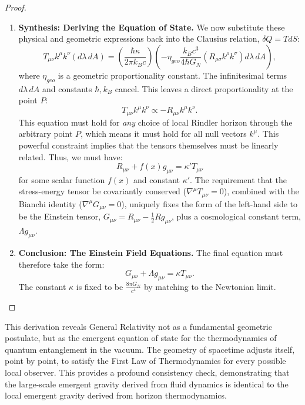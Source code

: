 \documentclass[11pt, letterpaper]{report}
\theoremstyle{plain} %
\theoremstyle{definition} %
\theoremstyle{remark} %
\begin{document}
\begin{proof}
\begin{enumerate}
    \item \textbf{Synthesis: Deriving the Equation of State.}
    We now substitute these physical and geometric expressions back into the Clausius relation, $\delta Q = T dS$:
    $$
    T_{\mu\nu} k^\mu k^\nu (d\lambda \, dA) = \left( \frac{\hbar \kappa}{2\pi k_B c} \right) \left( - \eta_{geo} \frac{k_B c^3}{4\hbar G_N} (R_{\rho\sigma}k^\rho k^\sigma) d\lambda \, dA \right),
    $$
    where $\eta_{geo}$ is a geometric proportionality constant. The infinitesimal terms $d\lambda \, dA$ and constants $\hbar, k_B$ cancel. This leaves a direct proportionality at the point $P$:
    \begin{equation}
        T_{\mu\nu} k^\mu k^\nu \propto -R_{\mu\nu}k^\mu k^\nu.
    \end{equation}
    This equation must hold for \textit{any} choice of local Rindler horizon through the arbitrary point $P$, which means it must hold for all null vectors $k^\mu$. This powerful constraint implies that the tensors themselves must be linearly related. Thus, we must have:
    \begin{equation}
        R_{\mu\nu} + f(x) g_{\mu\nu} = \kappa' T_{\mu\nu}
    \end{equation}
    for some scalar function $f(x)$ and constant $\kappa'$. The requirement that the stress-energy tensor be covariantly conserved ($\nabla^\mu T_{\mu\nu}=0$), combined with the Bianchi identity ($\nabla^\mu G_{\mu\nu}=0$), uniquely fixes the form of the left-hand side to be the Einstein tensor, $G_{\mu\nu} = R_{\mu\nu} - \frac{1}{2}Rg_{\mu\nu}$, plus a cosmological constant term, $\Lambda g_{\mu\nu}$.

    \item \textbf{Conclusion: The Einstein Field Equations.}
    The final equation must therefore take the form:
    \begin{equation}
        G_{\mu\nu} + \Lambda g_{\mu\nu} = \kappa T_{\mu\nu}.
    \end{equation}
    The constant $\kappa$ is fixed to be $\frac{8\pi G_N}{c^4}$ by matching to the Newtonian limit.
\end{enumerate}
\end{proof}
This derivation reveals General Relativity not as a fundamental geometric postulate, but as the emergent equation of state for the thermodynamics of quantum entanglement in the vacuum. The geometry of spacetime adjusts itself, point by point, to satisfy the First Law of Thermodynamics for every possible local observer. This provides a profound consistency check, demonstrating that the large-scale emergent gravity derived from fluid dynamics is identical to the local emergent gravity derived from horizon thermodynamics.
\end{document}
